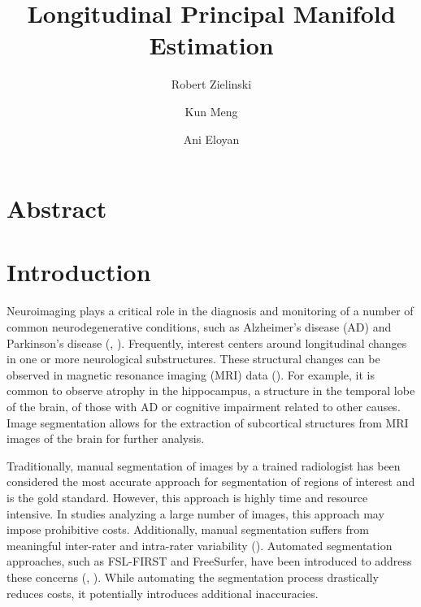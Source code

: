 \documentclass[11pt,reqno]{article}
\theoremstyle{definition}
\begin{document}
\title{Longitudinal Principal Manifold Estimation}
\author[1]{Robert Zielinski}
\author[2]{Kun Meng}
\author[1]{Ani Eloyan}



\maketitle

\doublespacing

\section*{Abstract}

\section{Introduction}

Neuroimaging plays a critical role in the diagnosis and monitoring of a number of common neurodegenerative conditions, such as Alzheimer's disease (AD) and Parkinson's disease (\cite{knopmanAlzheimerDisease2021}, \cite{poeweParkinsonDisease2017}). Frequently, interest centers around longitudinal changes in one or more neurological substructures. These structural changes can be observed in magnetic resonance imaging (MRI) data (\cite{crainiceanu2016tutorial}). For example, it is common to observe atrophy in the hippocampus, a structure in the temporal lobe of the brain, of those with AD or cognitive impairment related to other causes. Image segmentation allows for the extraction of subcortical structures from MRI images of the brain for further analysis.

Traditionally, manual segmentation of images by a trained radiologist has been considered the most accurate approach for segmentation of regions of interest and is the gold standard. However, this approach is highly time and resource intensive. In studies analyzing a large number of images, this approach may impose prohibitive costs. Additionally, manual segmentation suffers from meaningful inter-rater and intra-rater variability (\cite{boccardiSurveyProtocolsManual2011}). Automated segmentation approaches, such as FSL-FIRST and FreeSurfer, have been introduced to address these concerns (\cite{patenaudeBayesianModelShape2011}, \cite{reuterWithinsubjectTemplateEstimation2012}). While automating the segmentation process drastically reduces costs, it potentially introduces additional inaccuracies.
\end{document}
